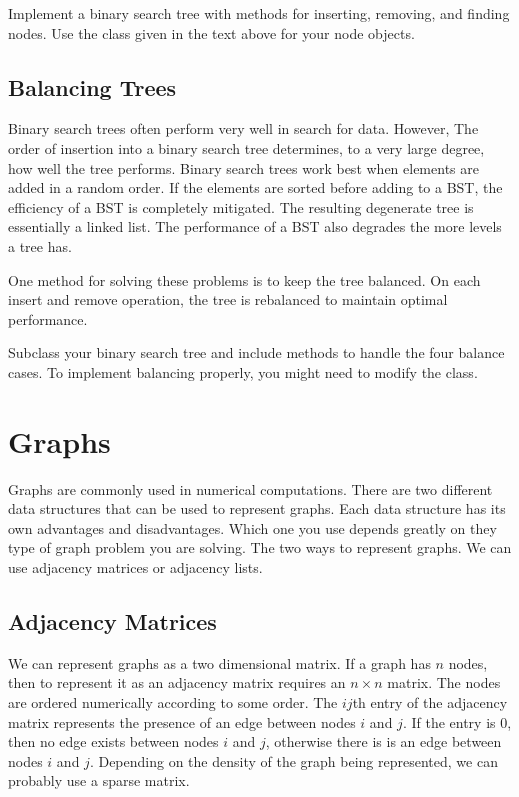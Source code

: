\begin{problem}
Implement a binary search tree with methods for inserting, removing, and finding nodes.
Use the  class given in the text above for your node objects.
\end{problem}

\subsection*{Balancing Trees}
Binary search trees often perform very well in search for data.
However, The order of insertion into a binary search tree determines, to a very large degree, how well the tree performs.
Binary search trees work best when elements are added in a random order.
If the elements are sorted before adding to a BST, the efficiency of a BST is completely mitigated.  The resulting degenerate tree is essentially a linked list.
The performance of a BST also degrades the more levels a tree has. 

One method for solving these problems is to keep the tree balanced.
On each insert and remove operation, the tree is rebalanced to maintain optimal performance.
 
\begin{problem}
Subclass your binary search tree and include methods to handle the four balance cases.
To implement balancing properly, you might need to modify the  class.
\end{problem}

\section*{Graphs}
Graphs are commonly used in numerical computations.
There are two different data structures that can be used to represent graphs.
Each data structure has its own advantages and disadvantages.
Which one you use depends greatly on they type of graph problem you are solving.
The two ways to represent graphs.  We can use adjacency matrices or adjacency lists.

\subsection*{Adjacency Matrices}
We can represent graphs as a two dimensional matrix.  If a graph has $n$ nodes, then
to represent it as an adjacency matrix requires an $n \times n$ matrix.
The nodes are ordered numerically according to some order.
The $ij$th entry of the adjacency matrix represents the presence of an edge between nodes $i$ and $j$.
If the entry is 0, then no edge exists between nodes $i$ and $j$, otherwise there is is an edge between nodes $i$ and $j$.
Depending on the density of the graph being represented, we can probably use a sparse matrix.

